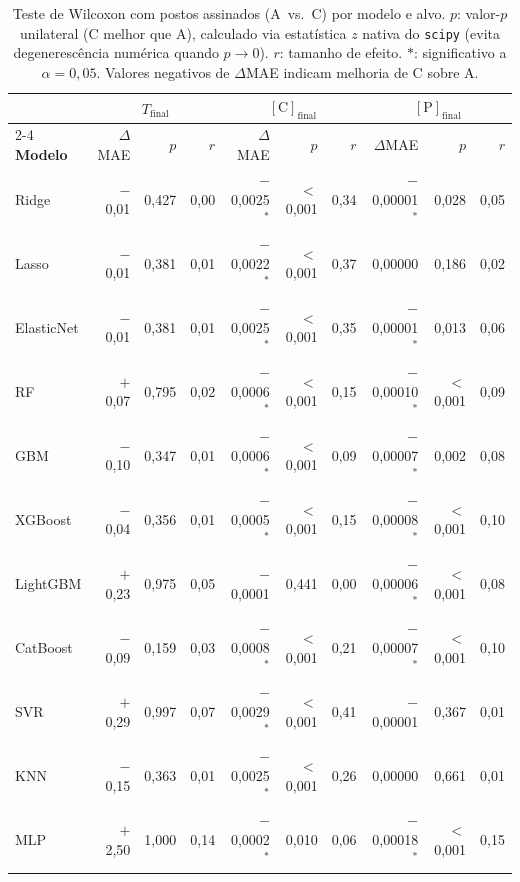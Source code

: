\begin{table}[H]
\caption{Teste de Wilcoxon com postos assinados (A~vs.~C) por modelo e alvo. $p$: valor-$p$ unilateral (C melhor que A), calculado via estatística $z$ nativa do \texttt{scipy} (evita degenerescência numérica quando $p \to 0$). $r$: tamanho de efeito. $\ast$: significativo a $\alpha = 0{,}05$. Valores negativos de $\Delta$MAE indicam melhoria de C sobre A.}
\label{tbl:wilcoxon_detail}
\centering
\footnotesize
\setlength{\tabcolsep}{3pt}
\begin{tabular}{lrrrrrrrrr}
\hline
 & \multicolumn{3}{c}{$T_\text{final}$} & \multicolumn{3}{c}{$[\text{C}]_\text{final}$} & \multicolumn{3}{c}{$[\text{P}]_\text{final}$} \\
\cline{2-4}\cline{5-7}\cline{8-10}
\textbf{Modelo} & $\Delta$MAE & $p$ & $r$ & $\Delta$MAE & $p$ & $r$ & $\Delta$MAE & $p$ & $r$ \\
\hline
Ridge      & $-$0,01 & 0,427 & 0,00 & $-$0,0025$^\ast$ & $<$0,001 & 0,34 & $-$0,00001$^\ast$ & 0,028 & 0,05 \\
Lasso      & $-$0,01 & 0,381 & 0,01 & $-$0,0022$^\ast$ & $<$0,001 & 0,37 & 0,00000 & 0,186 & 0,02 \\
ElasticNet & $-$0,01 & 0,381 & 0,01 & $-$0,0025$^\ast$ & $<$0,001 & 0,35 & $-$0,00001$^\ast$ & 0,013 & 0,06 \\
RF         & $+$0,07 & 0,795 & 0,02 & $-$0,0006$^\ast$ & $<$0,001 & 0,15 & $-$0,00010$^\ast$ & $<$0,001 & 0,09 \\
GBM        & $-$0,10 & 0,347 & 0,01 & $-$0,0006$^\ast$ & $<$0,001 & 0,09 & $-$0,00007$^\ast$ & 0,002 & 0,08 \\
XGBoost    & $-$0,04 & 0,356 & 0,01 & $-$0,0005$^\ast$ & $<$0,001 & 0,15 & $-$0,00008$^\ast$ & $<$0,001 & 0,10 \\
LightGBM   & $+$0,23 & 0,975 & 0,05 & $-$0,0001 & 0,441 & 0,00 & $-$0,00006$^\ast$ & $<$0,001 & 0,08 \\
CatBoost   & $-$0,09 & 0,159 & 0,03 & $-$0,0008$^\ast$ & $<$0,001 & 0,21 & $-$0,00007$^\ast$ & $<$0,001 & 0,10 \\
SVR        & $+$0,29 & 0,997 & 0,07 & $-$0,0029$^\ast$ & $<$0,001 & 0,41 & $-$0,00001 & 0,367 & 0,01 \\
KNN        & $-$0,15 & 0,363 & 0,01 & $-$0,0025$^\ast$ & $<$0,001 & 0,26 & 0,00000 & 0,661 & 0,01 \\
MLP        & $+$2,50 & 1,000 & 0,14 & $-$0,0002$^\ast$ & 0,010 & 0,06 & $-$0,00018$^\ast$ & $<$0,001 & 0,15 \\
\hline
\end{tabular}
\end{table}

